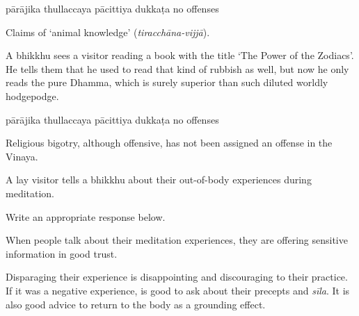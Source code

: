 \begin{exam}{\autoExamName}
\begin{problem*}
\begin{parts}
  \bigskip

  \begin{answers}{5}
    \bChoices
     pārājika\eAns
     thullaccaya\eAns
     pācittiya\eAns
     dukkaṭa\eAns
     no offenses\eAns
    \eChoices
  \end{answers}

  \begin{solution}
    Claims of `animal knowledge' (\emph{tiracchāna-vijjā}).
  \end{solution}

  \bigskip

  \item A bhikkhu sees a visitor reading a book with the title `The Power of the Zodiacs'.
  He tells them that he used to read that kind of rubbish as well,
  but now he only reads the pure Dhamma,
  which is surely superior than such diluted worldly hodgepodge.

  \bigskip

  \begin{answers}{5}
    \bChoices
     pārājika\eAns
     thullaccaya\eAns
     pācittiya\eAns
     dukkaṭa\eAns
     no offenses\eAns
    \eChoices
  \end{answers}

  \begin{solution}
    Religious bigotry, although offensive, has not been assigned an offense in the Vinaya.
  \end{solution}

  \bigskip

  \item A lay visitor tells a bhikkhu about their out-of-body experiences during meditation.

  Write an appropriate response below.

  \bigskip


  \begin{solution}
    When people talk about their meditation experiences, they are offering
    sensitive information in good trust.

    Disparaging their experience is disappointing and discouraging to their
    practice. If it was a negative experience, is good to ask about their
    precepts and \emph{sīla}. It is also good advice to return to the body as a
    grounding effect.
  \end{solution}


\end{parts}
\end{problem*}
\end{exam}

